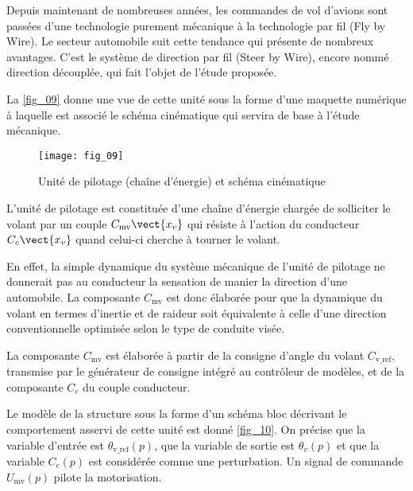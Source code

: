 \ifprof
\else
\begin{multicols}{2}
\fi

\setcounter{numques}{0}

Depuis maintenant de nombreuses années, les commandes de vol d'avions sont passées d'une
technologie purement mécanique à la technologie par fil (Fly by Wire). Le secteur automobile suit cette
tendance qui présente de nombreux avantages. C'est le système de direction par fil (Steer by Wire), encore nommé direction découplée, qui fait l'objet de l'étude proposée.


La \autoref{fig_09} donne une vue de cette unité sous la forme d'une maquette numérique à laquelle est
associé le schéma cinématique qui servira de base à l'étude mécanique.

\begin{figure}[H]
\centering
\texttt{[image: fig\_09]}

\caption{Unité de pilotage (chaîne d'énergie) et schéma cinématique  \label{fig_09}}
\end{figure}

L'unité de pilotage est constituée d'une chaîne d'énergie chargée de solliciter le volant par un
couple $C_{\text{mv}} \vect{x_v}$ qui résiste à l'action du conducteur $C_{c} \vect{x_v}$
quand celui-ci cherche à tourner le volant.

En effet, la simple dynamique du système mécanique de l'unité de pilotage ne donnerait pas au
conducteur la sensation de manier la direction d'une automobile. La composante $C_{\text{mv}}$ est donc élaborée pour que la dynamique du volant en termes d'inertie et de raideur soit équivalente à celle d'une direction conventionnelle optimisée selon le type de conduite visée.

La composante $C_{\text{mv}}$ est élaborée à partir de la consigne d'angle du volant $C_{\text{v\_ref}}$, transmise par le
générateur de consigne intégré au contrôleur de modèles, et de la composante $C_c$ du couple
conducteur.

Le modèle de la structure sous la forme d'un schéma bloc décrivant le comportement asservi de cette
unité est donné \autoref{fig_10}. On précise que la variable d'entrée est $\theta_{\text{v\_ref}}(p)$, que la variable de sortie est $\theta_{v}(p)$ et que la variable $C_c(p)$ est considérée comme une perturbation. Un signal de commande $U_{\text{mv}}(p)$ pilote la motorisation.




\end{multicols}
